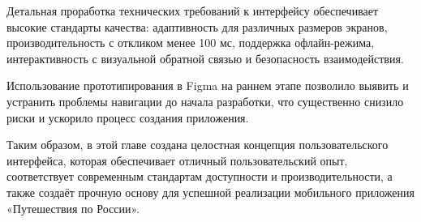 Детальная проработка технических требований к интерфейсу обеспечивает высокие стандарты качества: адаптивность для различных размеров экранов, производительность с откликом менее 100 мс, поддержка офлайн-режима, интерактивность с визуальной обратной связью и безопасность взаимодействия.

Использование прототипирования в Figma на раннем этапе позволило выявить и устранить проблемы навигации до начала разработки, что существенно снизило риски и ускорило процесс создания приложения.

Таким образом, в этой главе создана целостная концепция пользовательского интерфейса, которая обеспечивает отличный пользовательский опыт, соответствует современным стандартам доступности и производительности, а также создаёт прочную основу для успешной реализации мобильного приложения «Путешествия по России».
